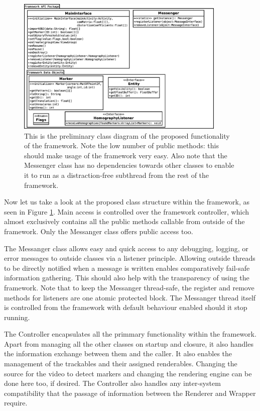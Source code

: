 \begin{figure}
	\centering
	\includegraphics[width=10cm]{img/class_diagram.eps}
	\caption[General Class Diagram]{This is the preliminary class diagram of the proposed functionality of the framework. Note the low number of public methods: this should make usage of the framework very easy. Also note that the Messenger class has no dependencies towards other classes to enable it to run as a distraction-free subthread from the rest of the framework.}
	\label{fig:class_diagram}
\end{figure}

Now let us take a look at the proposed class structure within the framework, as seen in Figure \ref{fig:class_diagram}.
Main access is controlled over the framework controller, which almost exclusively contains all the public methods callable from outside of the framework.
Only the Messanger class offers public access too.

The Messanger class allows easy and quick access to any debugging, logging, or error messages to outside classes via a listener principle.
Allowing outside threads to be directly notified when a message is written enables comparatively fail-safe information gathering.
This should also help with the transparency of using the framework.
Note that to keep the Messanger thread-safe, the register and remove methods for listeners are one atomic protected block.
The Messanger thread itself is controlled from the framework with default behaviour enabled should it stop running.

The Controller encapsulates all the primmary functionality within the framework.
Apart from managing all the other classes on startup and closure, it also handles the information exchange between them and the caller.
It also enables the management of the trackables and their assigned renderables.
Changing the source for the video to detect markers and changing the rendering engine can be done here too, if desired.
The Controller also handles any inter-system compatibility that the passage of information between the Renderer and Wrapper require.

